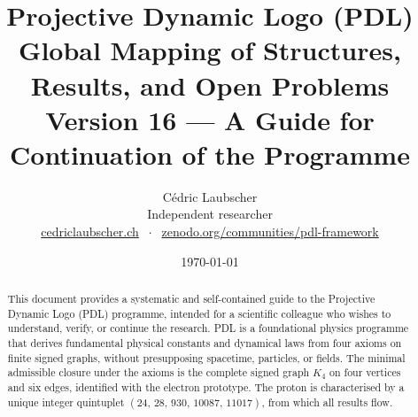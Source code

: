\documentclass[11pt,a4paper]{article}
\title{Projective Dynamic Logo (PDL)\\[4pt]
\large Global Mapping of Structures, Results, and Open Problems\\[2pt]
\normalsize Version 16 --- A Guide for Continuation of the Programme}
\author{C\'edric Laubscher\\[4pt]
\small Independent researcher\\
\small \href{https://cedriclaubscher.ch}{cedriclaubscher.ch}
$\;\cdot\;$
\small \href{https://zenodo.org/communities/pdl-framework/}{zenodo.org/communities/pdl-framework}}
\date{\today}
\theoremstyle{plain}
\theoremstyle{definition}
\theoremstyle{remark}
\newcommand{\Kfour}{K_4}
\newcommand{\quintuplet}{(24,\,28,\,930,\,10087,\,11017)}
\begin{document}
\maketitle
\setcounter{tocdepth}{2}

\begin{abstract}
This document provides a systematic and self-contained guide to the Projective Dynamic Logo (PDL) programme, intended for a scientific colleague who wishes to understand, verify, or continue the research.
PDL is a foundational physics programme that derives fundamental physical constants and dynamical laws from four axioms on finite signed graphs, without presupposing spacetime, particles, or fields.
The minimal admissible closure under the axioms is the complete signed graph $\Kfour$ on four vertices and six edges, identified with the electron prototype.
The proton is characterised by a unique integer quintuplet $\quintuplet$, from which all results flow.


\end{abstract}
\end{document}
